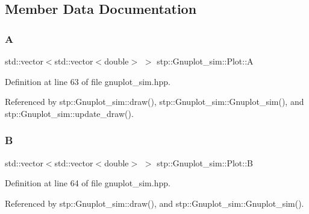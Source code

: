 \subsection{Member Data Documentation}
\mbox{\label{structstp_1_1_gnuplot__sim_1_1_plot_a81f7c65e2f66254a85f70a58cf285f73}} 
\subsubsection{\texorpdfstring{A}{A}}
{\footnotesize\ttfamily std\+::vector$<$std\+::vector$<$double$>$ $>$ stp\+::\+Gnuplot\+\_\+sim\+::\+Plot\+::A}



Definition at line 63 of file gnuplot\+\_\+sim.\+hpp.



Referenced by stp\+::\+Gnuplot\+\_\+sim\+::draw(), stp\+::\+Gnuplot\+\_\+sim\+::\+Gnuplot\+\_\+sim(), and stp\+::\+Gnuplot\+\_\+sim\+::update\+\_\+draw().

\mbox{\label{structstp_1_1_gnuplot__sim_1_1_plot_a097858b4b2ff6da39924ee9c1427e8b0}} 
\subsubsection{\texorpdfstring{B}{B}}
{\footnotesize\ttfamily std\+::vector$<$std\+::vector$<$double$>$ $>$ stp\+::\+Gnuplot\+\_\+sim\+::\+Plot\+::B}



Definition at line 64 of file gnuplot\+\_\+sim.\+hpp.



Referenced by stp\+::\+Gnuplot\+\_\+sim\+::draw(), and stp\+::\+Gnuplot\+\_\+sim\+::\+Gnuplot\+\_\+sim().

\mbox{\label{structstp_1_1_gnuplot__sim_1_1_plot_ad0c15571b7ebf84061341863e00f4dd6}} 
